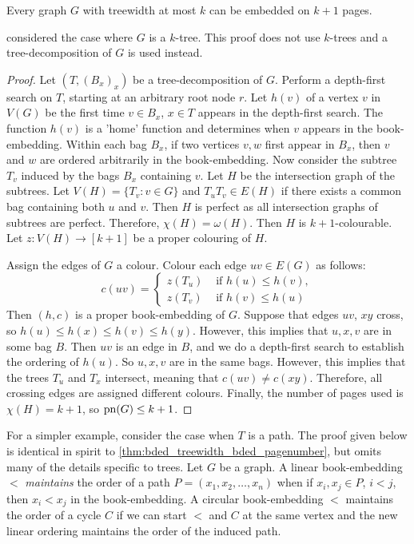 \begin{theorem}\label{thm:bded_treewidth_bded_pagenumber}
	Every graph \(G\) with treewidth at most $k$ can be embedded on $k + 1$ pages.
\end{theorem}
\textcite{ganleyPagenumberTrees2001} considered the case where \(G\) is a \(k\)-tree. This proof does not use $k$-trees and a tree-decomposition of \(G\) is used instead. 

\begin{proof}
	Let  $(T, (B_x)_x)$ be a tree-decomposition of \(G\). Perform a depth-first search on \(T\), starting at an arbitrary root node \(r\). Let \(h(v)\) of a vertex \(v\) in \(V(G)\) be the first time \(v \in B_x\), $x \in T$ appears in the depth-first search. The function $h(v)$ is a 'home' function and determines when $v$ appears in the book-embedding. Within each bag $B_x$, if two vertices $v,w$ first appear in $B_x$, then $v$ and $w$ are ordered arbitrarily in the book-embedding. Now consider the subtree \(T_v\) induced by the bags \(B_x\) containing \(v\). Let \(H\) be the intersection graph of the subtrees. Let \(V(H) = \lbrace T_v : v \in G \rbrace\) and \(T_u T_v \in E(H)\) if there exists a common bag containing both $u$ and $v$. Then \(H\) is perfect as all intersection graphs of subtrees are perfect. Therefore, \(\chi(H) = \omega(H)\). Then \(H\) is \(k + 1\)-colourable. Let $z: V(H) \rightarrow [k + 1]$ be a proper colouring of $H$. 

	Assign the edges of \(G\) a colour. Colour each edge \(uv \in E(G)\) as follows:
	\begin{equation}
		c(uv) =
		\begin{cases}
			z(T_u) & \text{ if } h(u) \leq h(v), \\
			z(T_v) & \text{ if } h(v) \leq h(u)
		\end{cases}
	\end{equation}
	Then $(h, c)$ is a proper book-embedding of \(G\). Suppose that edges \(uv\), \(xy\) cross, so \(h(u) \leq h(x) \leq h(v) \leq h(y)\). However, this implies that $u,x,v$ are in some bag $B$. Then \(uv\) is an edge in \(B\), and we do a depth-first search to establish the ordering of $h(u)$. So \(u, x, v\) are in the same bags. However, this implies that the trees \(T_u\) and \(T_x\) intersect, meaning that \(c(uv) \neq c(xy)\). Therefore, all crossing edges are assigned different colours. Finally, the number of pages used is \(\chi(H) = k + 1\), so \(\operatorname{pn}(G) \leq k + 1\). 
\end{proof}
For a simpler example, consider the case when $T$ is a path. The proof given below is identical in spirit to \cref{thm:bded_treewidth_bded_pagenumber}, but omits many of the details specific to trees. 
Let $G$ be a graph. A linear book-embedding $<$ \textit{maintains} the order of a path $P = (x_1, x_2, \ldots, x_n)$ when if $x_i, x_j \in P$, $i < j$, then $x_i < x_j$ in the book-embedding. A circular book-embedding $<$ maintains the order of a cycle $C$ if we can start $<$ and $C$ at the same vertex and the new linear ordering maintains the order of the induced path. 

